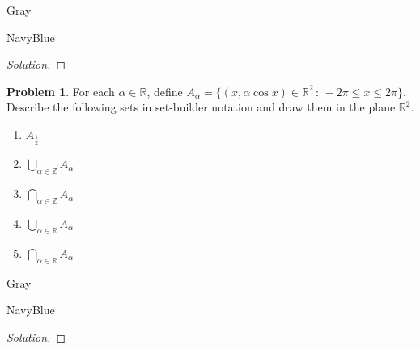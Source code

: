 \documentclass[12pt]{amsart}
\newcounter{problem_number}[section]
\theoremstyle{named}
\newenvironment{soln}
{\begin{color}{Gray}\begin{framed}\begin{color}{NavyBlue}\begin{proof}[Solution]
\doublespacing}
{\end{proof}\end{color}\end{framed}\end{color}}
\theoremstyle{definition}
\newtheorem{problem}{Problem}
\newcommand{\R}{\mathbb R}
\newcommand{\Z}{\mathbb Z}
\begin{document}
\begin{soln}
	
\end{soln}

\begin{problem}
	For each $\alpha\in\R$, define $A_\alpha = \{(x,\alpha\cos x)\in\R^2\,:\, -2\pi\leq x\leq 2\pi\}$.
	Describe the following sets in set-builder notation and draw them in the plane $\R^2$.
	\begin{enumerate}
		\item $\displaystyle A_\frac{1}{2}$
		\item $\displaystyle\bigcup_{\alpha\in\Z} A_\alpha$
		\item $\displaystyle\bigcap_{\alpha\in\Z} A_\alpha$
		\item $\displaystyle\bigcup_{\alpha\in\R} A_\alpha$
		\item $\displaystyle\bigcap_{\alpha\in\R} A_\alpha$
	\end{enumerate}
\end{problem}

\begin{soln}
	
\end{soln}
\end{document}
